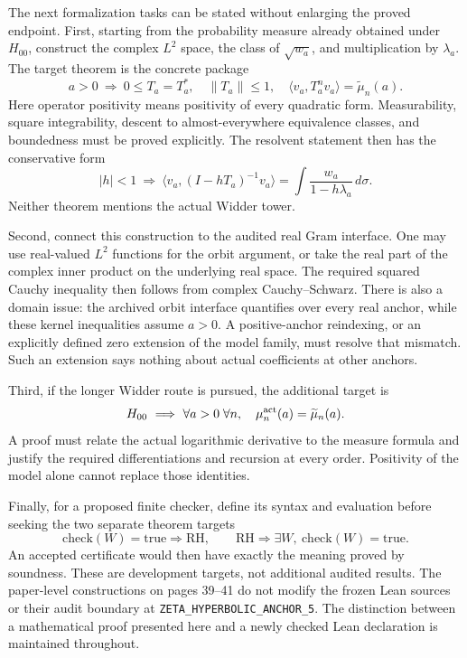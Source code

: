 \label{front:targets}

The next formalization tasks can be stated without enlarging the proved
endpoint. First, starting from the probability measure already obtained
under $H_{00}$, construct the complex $L^2$ space, the class of
$\sqrt{w_a}$, and multiplication by $\lambda_a$. The target theorem is
the concrete package
\begin{equation}
 a>0\ \Longrightarrow\
 0\leq T_a=T_a^*,\quad\|T_a\|\leq1,\quad
 \langle v_a,T_a^nv_a\rangle=\widetilde\mu_n(a).
\end{equation}
Here operator positivity means positivity of every quadratic form.
Measurability, square integrability, descent to almost-everywhere
equivalence classes, and boundedness must be proved explicitly. The
resolvent statement then has the conservative form
\begin{equation}
 |h|<1\ \Longrightarrow\
 \langle v_a,(I-hT_a)^{-1}v_a\rangle
 =\int\frac{w_a}{1-h\lambda_a}\,d\sigma.
\end{equation}
Neither theorem mentions the actual Widder tower.

Second, connect this construction to the audited real Gram interface.
One may use real-valued $L^2$ functions for the orbit argument, or take
the real part of the complex inner product on the underlying real
space. The required squared Cauchy inequality then follows from complex
Cauchy--Schwarz. There is also a domain issue: the archived orbit
interface quantifies over every real anchor, while these kernel
inequalities assume $a>0$. A positive-anchor reindexing, or an explicitly
defined zero extension of the model family, must resolve that mismatch.
Such an extension says nothing about actual coefficients at other anchors.

Third, if the longer Widder route is pursued, the additional target is
\begin{equation}
 H_{00}\ \Longrightarrow\
 \forall a>0\;\forall n,\quad
 \mu_n^{\rm act}(a)=\widetilde\mu_n(a).
\end{equation}
A proof must relate the actual logarithmic derivative to the measure
formula and justify the required differentiations and recursion at every
order. Positivity of the model alone cannot replace those identities.

Finally, for a proposed finite checker, define its syntax and evaluation
before seeking the two separate theorem targets
\begin{equation}
 \mathrm{check}(W)=\mathrm{true}\Rightarrow\mathrm{RH},\qquad
 \mathrm{RH}\Rightarrow\exists W,\ \mathrm{check}(W)=\mathrm{true}.
\end{equation}
An accepted certificate would then have exactly the meaning proved by
soundness. These are development targets, not additional audited results.
The paper-level constructions on pages 39--41 do not modify the frozen
Lean sources or their audit boundary at
\texttt{ZETA\_HYPERBOLIC\_ANCHOR\_5}. The distinction between a
mathematical proof presented here and a newly checked Lean declaration
is maintained throughout.
